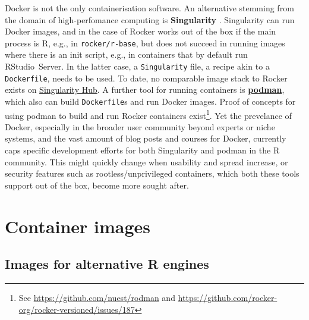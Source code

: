 Docker is not the only containerisation software. An alternative
stemming from the domain of high-perfomance computing is
\textbf{Singularity} \citep{kurtzer_singularity_2017}. Singularity can
run Docker images, and in the case of Rocker works out of the box if the
main process is R, e.g., in \texttt{rocker/r-base}, but does not succeed
in running images where there is an init script, e.g., in containers
that by default run RStudio~Server. In the latter case, a
\texttt{Singularity} file, a recipe akin to a \texttt{Dockerfile}, needs
to be used. To date, no comparable image stack to Rocker exists on
\href{https://singularity-hub.org/}{Singularity Hub}. A further tool for
running containers is
\href{https://github.com/containers/libpod}{\textbf{podman}}, which also
can build \texttt{Dockerfile}s and run Docker images. Proof of concepts
for using podman to build and run Rocker containers
exist\footnote{See \href{https://github.com/nuest/rodman}{https://github.com/nuest/rodman} and \href{https://github.com/rocker-org/rocker-versioned/issues/187}{https://github.com/rocker-org/rocker-versioned/issues/187}}.
Yet the prevelance of Docker, especially in the broader user community
beyond experts or niche systems, and the vast amount of blog posts and
courses for Docker, currently caps specific development efforts for both
Singularity and podman in the R community. This might quickly change
when usability and spread increase, or security features such as
rootless/unprivileged containers, which both these tools support out of
the box, become more sought after.

\hypertarget{container-images}{%
\section{Container images}\label{container-images}}

\label{images}

\hypertarget{images-for-alternative-r-engines}{%
\subsection{Images for alternative R
engines}\label{images-for-alternative-r-engines}}

\label{alternatives}

